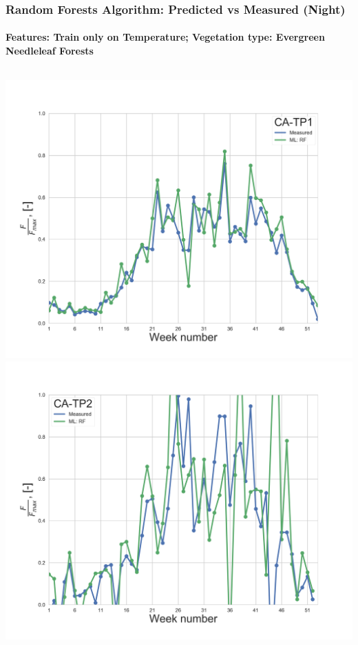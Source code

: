 \documentclass{beamer}
\begin{document}
\begin{frame}
\frametitle{Random Forests Algorithm: Predicted vs Measured (Night)}
\framesubtitle{Features: Train only on Temperature; Vegetation type: Evergreen Needleleaf Forests}
\begin{columns}[t]
\centering
\includegraphics[width=\textwidth]{F_scaled_ML_ENF_Only_T_With9010_Quartiles/trains/CA-TP1.png}\\
\includegraphics[width=\textwidth]{F_scaled_ML_ENF_Only_T_With9010_Quartiles/trains/CA-TP2.png}


\end{columns}
\end{frame}
\end{document}
